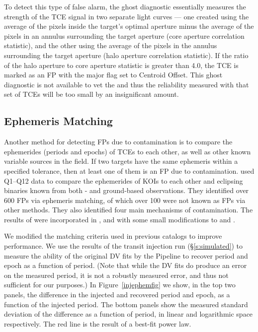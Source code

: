 To detect this type of false alarm, the ghost diagnostic essentially measures the strength of the TCE signal in two separate light curves --- one created using the average of the pixels inside the target's optimal aperture minus the average of the pixels in an annulus surrounding the target aperture (core aperture correlation statistic), and the other using the average of the pixels in the annulus surrounding the target aperture (halo aperture correlation statistic). If the ratio of the halo aperture to core aperture statistic is greater than 4.0, the TCE is marked as an FP with the major flag set to Centroid Offset. This ghost diagnostic is not available to vet the  and thus the reliability measured with that set of TCEs will be too small by an insignificant amount.



\subsection{Ephemeris Matching}
\label{ephemmatchsec}
\label{s:ephemmatch}

Another method for detecting FPs due to contamination is to compare the ephemerides (periods and epochs) of TCEs to each other, as well as other known variable sources in the \kepler{} field. If two targets have the same ephemeris within a specified tolerance, then at least one of them is an FP due to contamination. \citet{Coughlin2014a} used Q1--Q12 data to compare the ephemerides of KOIs to each other and eclipsing binaries known from both \kepler{}- and ground-based observations. They identified over 600 FPs via ephemeris matching, of which over 100 were not known as FPs via other methods. They also identified four main mechanisms of contamination. The results of \citet{Coughlin2014a} were incorporated in \citet[][see \S3.3]{Rowe2015a}, and with some small modifications to \citet[][see \S5.3]{Mullally2015cat} and \citet{Coughlin2016}.

We modified the matching criteria used in previous catalogs to improve performance. We use the results of the transit injection run (\S\ref{s:simulated}) to measure the ability of the original DV fits by the \kepler{} Pipeline to recover period and epoch as a function of period. (Note that while the DV fits do produce an error on the measured period, it is not a robustly measured error, and thus not sufficient for our purposes.) In Figure~\ref{injephemfig} we show, in the top two panels, the difference in the injected and recovered period and epoch, as a function of the injected period. The bottom panels show the measured standard deviation of the difference as a function of period, in linear and logarithmic space respectively. The red line is the result of a best-fit power law.

